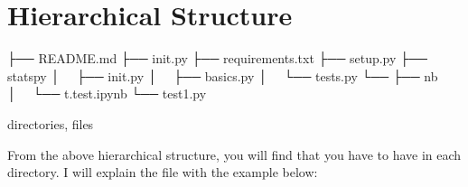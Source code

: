 \documentclass[letterpaper,12pt,english]{sphinxmanual}
\begin{document}
\section{Hierarchical Structure}
\label{\detokenize{pack:hierarchical-structure}}
%
\begin{sphinxVerbatim}[commandchars=\\\{\}]
├── README.md
├── \PYGZus{}\PYGZus{}init\PYGZus{}\PYGZus{}.py
├── requirements.txt
├── setup.py
├── statspy
│   ├── \PYGZus{}\PYGZus{}init\PYGZus{}\PYGZus{}.py
│   ├── basics.py
│   └── tests.py
└── 
    ├── nb
    │   └── t.test.ipynb
    └── test1.py

 directories,  files
\end{sphinxVerbatim}

From the above hierarchical structure, you will find that you have to have  in each directory. I will explain the  file with the example below:
\end{document}
